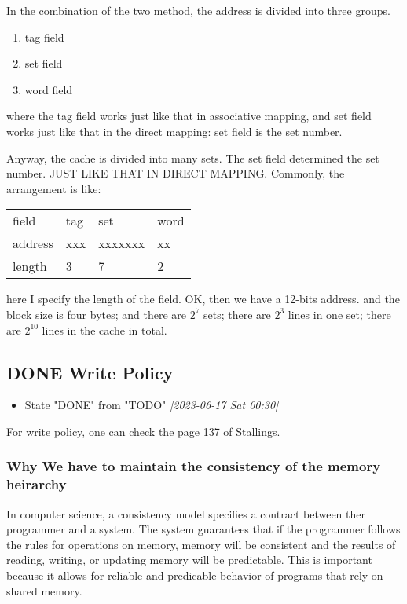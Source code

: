 \documentclass[11pt]{article}
\begin{document}
In the combination of the two method, the address is divided into three groups.
\begin{enumerate}
\item tag field
\item set field
\item word field
\end{enumerate}

where the tag field works just like that in associative mapping, and set field works just like that in the direct mapping: set field is the set number.

Anyway, the cache is divided into many sets. The set field determined the set number. JUST LIKE THAT IN DIRECT MAPPING. Commonly, the arrangement is like: 

\begin{center}
\begin{tabular}{llll}
field & tag & set & word\\
address & xxx & xxxxxxx & xx\\
length & 3 & 7 & 2\\
\end{tabular}
\end{center}

here I specify the length of the field. OK, then we have a 12-bits address. and the block size is four bytes; and there are \(2 ^7\) sets; there are \(2 ^3\) lines in one set; there are \(2 ^{10}\) lines in the cache in total.

\subsection{{\bfseries\sffamily DONE} Write Policy}
\label{sec:orgb56c254}
\begin{itemize}
\item State "DONE"       from "TODO"       \textit{[2023-06-17 Sat 00:30]}
\end{itemize}

For write policy, one can check the page 137 of Stallings.

\subsubsection{Why We have to maintain the consistency of the memory heirarchy}
\label{sec:org2d91e02}

In computer science, a consistency model specifies a contract between ther programmer and a system. The system guarantees that if the programmer follows the rules for operations on memory, memory will be consistent and the results of reading, writing, or updating memory will be predictable. This is important because it allows for reliable and predicable behavior of programs that rely on shared memory.
\end{document}
